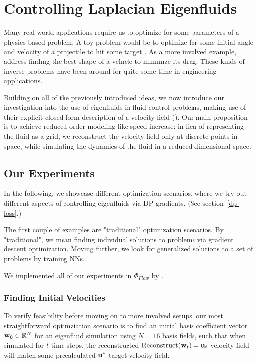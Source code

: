 \chapter{Controlling Laplacian Eigenfluids}
Many real world applications require us to optimize for some parameters of
a physics-based problem. A toy problem would be to optimize for some initial
angle and velocity of a projectile to hit some target . As a more involved example, \cite{MinDrag} address
finding the best shape of a vehicle to minimize its drag. These kinds of
inverse problems have been around for quite some time in engineering
applications.

Building on all of the previously introduced ideas, we now introduce our
investigation into the use of eigenfluids in fluid control problems, making use
of their explicit closed form description of a velocity field (). Our main proposition is to achieve reduced-order modeling-like
speed-increase: in lieu of representing the fluid as a grid, we reconstruct the
velocity field only at discrete points in space, while simulating the dynamics
of the fluid in a reduced dimensional space.

\section{Our Experiments}
In the following, we showcase different optimization scenarios, where we try out
different aspects of controlling eigenfluids via \acf{DP} gradients. (See
section~\ref{dp-loss}.)

The first couple of examples are "traditional" optimization scenarios. By
"traditional", we mean finding individual solutions to problems via gradient
descent optimization. Moving further, we look for generalized solutions to a set
of problems by training \acfp{NN}.

We implemented all of our experiments in $\Phi_{Flow}$
by \cite{holl2019pdecontrol}.

\subsection{Finding Initial Velocities}
To verify feasibility before moving on to more involved setups, our most
straightforward optimziation scenario is to find an initial basis coefficient
vector $\vb{w}_0 \in \mathbb{R}^N$ for an eigenfluid simulation using $N=16$
basis fields, such that when simulated for $t$ time steps, the reconstructed
$\text{Reconstruct}(\vb{w}_t) = \vb{u}_t$ velocity field will match some
precalculated $\vb{u}^*$ target velocity field.

